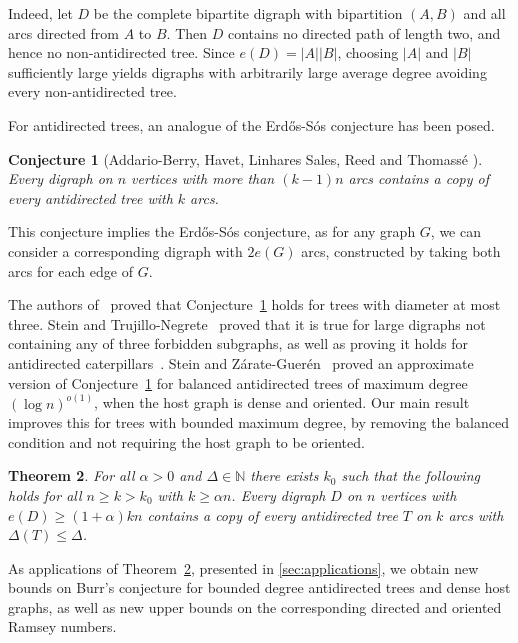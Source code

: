 \documentclass[11pt]{article}
\newtheorem{theorem}{Theorem}[section]
\newtheorem{conjecture}[theorem]{Conjecture}
\numberwithin{equation}{section}
\renewcommand{\geq}{\geqslant}
\renewcommand{\leq}{\leqslant}
\def\NN{\mathbb N}
\theoremstyle{definition}
\begin{document}
Indeed, let $D$ be the complete bipartite digraph with bipartition $(A,B)$ and all arcs directed from $A$ to $B$. Then $D$ contains no directed path of length two, and hence no non-antidirected tree. Since $e(D)= |A||B|$, choosing $|A|$ and $|B|$ sufficiently large yields digraphs with arbitrarily large average degree avoiding every non-antidirected tree.

For antidirected trees, an analogue of the Erd\H{o}s-S\'os conjecture has been posed.
 
\begin{conjecture}[Addario-Berry, Havet, Linhares Sales, Reed and Thomassé \cite{Addarioberry2013oriented}]\label{conj:main}
 Every digraph on $n$ vertices with more than $(k-1)n$ arcs contains a copy of every antidirected tree with $k$ arcs.
\end{conjecture}

This conjecture implies the Erd\H{o}s-S\'os conjecture, as for any graph $G$, we can consider a corresponding digraph with $2e(G)$ arcs, constructed by taking both arcs for each edge of $G$.

The authors of~\cite{Addarioberry2013oriented} proved that Conjecture~\ref{conj:main} holds for trees with diameter at most three.
Stein and Trujillo-Negrete~\cite{stein_trujillo-negrete2025} proved that it is true for large digraphs not containing any of three forbidden subgraphs, as well as proving it holds for antidirected caterpillars~\cite{stein_trujillo-negrete2025}. Stein and Zárate-Guerén~\cite{Stein_Zarate-Gueren_2024} proved an approximate version of Conjecture~\ref{conj:main} for balanced antidirected trees of maximum degree $(\log n)^{o(1)}$, when the host graph is dense and oriented. Our main result improves this for trees with bounded maximum degree, by removing the balanced condition and not requiring the host graph to be oriented.  
\begin{theorem}\label{thm:main_dense}
    For all $\alpha>0$ and $\Delta\in \NN$ there exists $k_0$ such that the following holds for all $n\geq k>k_0$ with $k\geq \alpha n$. Every digraph  $D$ on $n$ vertices with $e(D)\geq (1+\alpha)kn$ contains a copy of every antidirected tree $T$ on $k$ arcs with $\Delta(T)\leq \Delta$.
\end{theorem}

As applications of Theorem~\ref{thm:main_dense}, presented in \cref{sec:applications}, we obtain new bounds on Burr's conjecture for bounded degree antidirected trees and dense host graphs, as well as new upper bounds on the corresponding directed and oriented Ramsey numbers.
\end{document}
